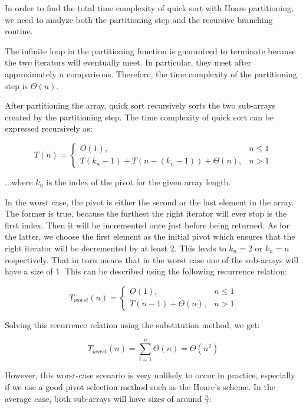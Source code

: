 In order to find the total time complexity of quick sort with Hoare partitioning, we need to analyze both the partitioning step and the recursive branching routine.

The infinite loop in the partitioning function is guaranteed to terminate because the two iterators will eventually meet. In particular, they meet after approximately $n$ comparisons. Therefore, the time complexity of the partitioning step is $\Theta(n)$.

After partitioning the array, quick sort recursively sorts the two sub-arrays created by the partitioning step. The time complexity of quick sort can be expressed recursively as:

\begin{equation*}
    T(n) = \begin{cases}
        O(1), & n \leq 1 \\
        T(k_n - 1) + T(n - (k_n - 1)) + \Theta(n), & n > 1
    \end{cases}
\end{equation*}

...where $k_n$ is the index of the pivot for the given array length.

In the worst case, the pivot is either the second or the last element in the array. The former is true, because the furthest the right iterator will ever stop is the first index. Then it will be incremented once just before being returned. As for the latter, we choose the first element as the initial pivot which ensures that the right iterator will be decremented by at least 2. This leads to $k_n = 2$ or $k_n = n$ respectively. That in turn means that in the worst case one of the sub-arrays will have a size of 1. This can be described using the following recurrence relation:

\begin{equation*}
    T_{worst}(n) = \begin{cases}
        O(1), & n \leq 1 \\
        T(n-1) + \Theta(n), & n > 1
    \end{cases}
\end{equation*}

Solving this recurrence relation using the substitution method, we get:

\begin{equation*}
    T_{worst}(n) = \sum_{i=1}^{n} \Theta(n) = \Theta(n^2)
\end{equation*}

However, this worst-case scenario is very unlikely to occur in practice, especially if we use a good pivot selection method such as the Hoare's scheme. In the average case, both sub-arrays will have sizes of around $\frac{n}{2}$:

